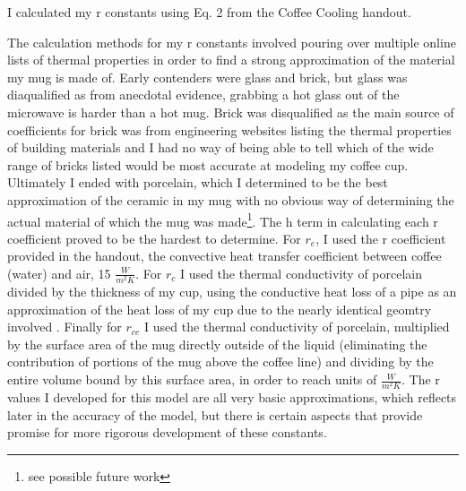 \documentclass[12pt]{article}
\begin{document}
I calculated my r constants using Eq. 2 from the Coffee Cooling handout.

The calculation methods for my r constants involved pouring over multiple online lists of thermal properties in order to find a strong approximation of the material my mug is made of. Early contenders were glass and brick, but glass was diaqualified as from anecdotal evidence, grabbing a hot glass out of the microwave is harder than a hot mug. Brick was disqualified as the main source of coefficients for brick was from engineering websites listing the thermal properties of building materials and I had no way of being able to tell which of the wide range of bricks listed would be most accurate at modeling my coffee cup. Ultimately I ended with porcelain, which I determined to be the best approximation of the ceramic in my mug with no obvious way of determining the actual material of which the mug was made\footnote{see possible future work}. The h term in calculating each r coefficient proved to be the hardest to determine. For $r_{e}$, I used the r coefficient provided in the handout, the convective heat transfer coefficient between coffee (water) and air, 15 $\frac{W}{m^2 K}$. For $r_{c}$ I used the thermal conductivity of porcelain divided by the thickness of my cup, using the conductive heat loss of a pipe as an approximation of the heat loss of my cup due to the nearly identical geomtry involved \cite{ET}. Finally for $r_{ce}$ I used the thermal conductivity of porcelain, multiplied by the surface area of the mug directly outside of the liquid (eliminating the contribution of portions of the mug above the coffee line) and dividing by the entire volume bound by this surface area, in order to reach units of $\frac{W}{m^2 K}$. The r values I developed for this model are all very basic approximations, which reflects later in the accuracy of the model, but there is certain aspects that provide promise for more rigorous development of these constants. 
\end{document}
